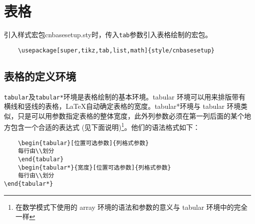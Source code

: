\chapter{表格}\label{cha:table}
引入样式宏包cnbasesetup.sty时，传入\verb|tab|参数引入表格绘制的宏包。
\begin{verbatim}
    \usepackage[super,tikz,tab,list,math]{style/cnbasesetup}
\end{verbatim}

\section{表格的定义环境}\label{sec:table-def-env}


\verb|tabular|及\verb|tabular*|环境是表格绘制的基本环境。tabular 环境可以用来排版带有横线和竖线的表格，\LaTeX 自动确定表格的宽度。tabular*环境与 tabular 环境类似，只是可以用参数指定表格的整体宽度，此外列参数必须在第一列后面的某个地方包含一个合适的表达式 (见下面说明)\footnote{在数学模式下使用的 array 环境的语法和参数的意义与 tabular 环境中的完全一样}。他们的语法格式如下：
\begin{verbatim}
    \begin{tabular}[位置可选参数]{列格式参数}
    每行由\\划分
    \end{tabular}
    \begin{tabular*}{宽度}[位置可选参数]{列格式参数}
    每行由\\划分
\end{tabular*}
\end{verbatim}



